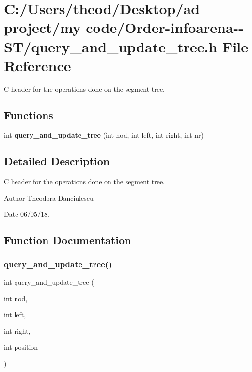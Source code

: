 \section{C\+:/\+Users/theod/\+Desktop/ad project/my code/\+Order-\/infoarena-\/-\/\+S\+T/query\+\_\+and\+\_\+update\+\_\+tree.h File Reference}
\label{query__and__update__tree_8h}


C header for the operations done on the segment tree.  


\subsection*{Functions}
\begin{DoxyCompactItemize}
\item 
int \textbf{ query\+\_\+and\+\_\+update\+\_\+tree} (int nod, int left, int right, int nr)
\end{DoxyCompactItemize}


\subsection{Detailed Description}
C header for the operations done on the segment tree. 

\begin{DoxyAuthor}{Author}
Theodora Danciulescu 
\end{DoxyAuthor}
\begin{DoxyDate}{Date}
06/05/18. 
\end{DoxyDate}


\subsection{Function Documentation}
\mbox{\label{query__and__update__tree_8h_a62124276d9fe31321535cff2b2de75d8}} 
\subsubsection{query\+\_\+and\+\_\+update\+\_\+tree()}
{\footnotesize\ttfamily int query\+\_\+and\+\_\+update\+\_\+tree (\begin{DoxyParamCaption}\item[{int}]{nod,  }\item[{int}]{left,  }\item[{int}]{right,  }\item[{int}]{position }\end{DoxyParamCaption})}


